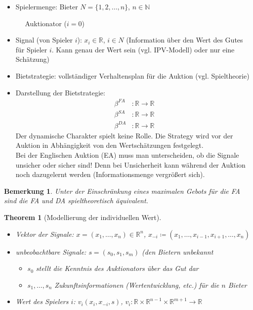 \documentclass[12pt]{extreport} %
\theoremstyle{named}
\newtheorem{unnamedtheorem}{Theorem} \counterwithin{unnamedtheorem}{chapter}
\theoremstyle{itshape}
\theoremstyle{normal}
\newtheorem*{bemerkung}{Bemerkung}
\begin{document}
\begin{itemize}
	\item Spielermenge: Bieter $N = \{1, 2, \dotsc, n \}$, $n \in \mathbb{N}$
	
		~\hspace{2.3cm}~ Auktionator ($i = 0$)
	\item Signal (von Spieler $i$): $x_{i} \in \mathbb{R}$, $i \in N$ (Information über den Wert des Gutes für Spieler $i$. Kann genau der Wert sein (vgl. IPV-Modell) oder nur eine Schätzung)
	\item Bietstrategie: vollständiger Verhaltensplan für die Auktion (vgl. Spieltheorie)
	\item Darstellung der Bietstrategie:
		\begin{align*}
			\beta^{FA} & \colon \mathbb{R} \rightarrow \mathbb{R} \\
			\beta^{SA} & \colon \mathbb{R} \rightarrow \mathbb{R} \\
			\beta^{DA} & \colon \mathbb{R} \rightarrow \mathbb{R} 
		\end{align*}
		Der dynamische Charakter spielt keine Rolle. Die Strategy wird vor der Auktion in Abhängigkeit von den Wertschätzungen festgelegt. \\
		
		Bei der Englischen Auktion (EA) muss man unterscheiden, ob die Signale unsicher oder sicher sind! Denn bei Unsicherheit kann während der Auktion noch dazugelernt werden (Informationsmenge vergrößert sich).	
\end{itemize}

\begin{bemerkung}
	Unter der Einschränkung eines maximalen Gebots für die FA sind die FA und DA spieltheoretisch äquivalent.
\end{bemerkung}
\newpage
{}
\begin{unnamedtheorem}[Modellierung der individuellen Wert] ~\
	\begin{itemize}
		\item Vektor der Signale: $x = (x_1, \dotsc, x_{n}) \in \mathbb{R}^{n}$, $x_{-i} \coloneqq (x_1, \dotsc, x_{i-1}, x_{i+1}, \dotsc, x_{n})$
		\item unbeobachtbare Signale: $s = (s_{0}, s_{1}, s_{m})$ (den Bietern unbekannt
			\begin{itemize}
				\item $s_0$ stellt die Kenntnis des Auktionators über das Gut dar
				\item $s_1, \dotsc, s_n$ Zukunftsinformationen (Wertentwicklung, etc.) für die $n$ Bieter
			\end{itemize}
		\item Wert des Spielers $i$: $v_{i}(x_{i}, x_{-i}, s)$, $v_{i} \colon \mathbb{R} \times \mathbb{R}^{n-1} \times \mathbb{R}^{m+1} \rightarrow \mathbb{R}$
	\end{itemize}
\end{unnamedtheorem}
\end{document}
